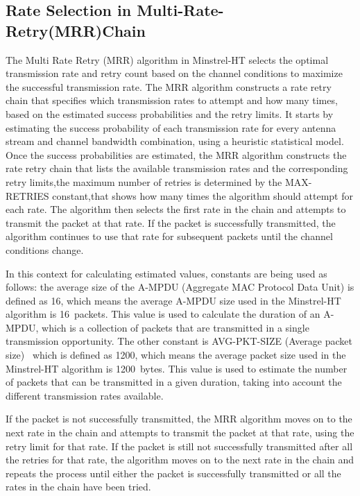 \subsection{Rate Selection in Multi-Rate-Retry(MRR)Chain}

The Multi Rate Retry (MRR) algorithm in Minstrel-HT selects the optimal transmission rate and retry count based on the channel conditions to maximize the successful transmission rate. The MRR algorithm constructs a rate retry chain that specifies which transmission rates to attempt and how many times, based on the estimated success probabilities and the retry limits. It starts by estimating the success probability of each transmission rate for every antenna stream and channel bandwidth combination, using a heuristic statistical model. Once the success probabilities are estimated, the MRR algorithm constructs the rate retry chain that lists the available transmission rates and the corresponding retry limits,the maximum number of retries is determined by the MAX-RETRIES constant,that shows how many times the algorithm should attempt for each rate. The algorithm then selects the first rate in the chain and attempts to transmit the packet at that rate. If the packet is successfully transmitted, the algorithm continues to use that rate for subsequent packets until the channel conditions change. 

In this context for calculating estimated values, constants are being used as follows: the average size of the A-MPDU (Aggregate MAC Protocol Data Unit) is defined as 16, which means the average A-MPDU size used in the Minstrel-HT algorithm is 16~packets. This value is used to calculate the duration of an A-MPDU, which is a collection of packets that are transmitted in a single transmission opportunity. The other constant is  AVG-PKT-SIZE (Average packet size)~\label{item:AVG_PKT_SIZE} which is defined as 1200, which means the average packet size used in the Minstrel-HT algorithm is 1200~bytes. This value is used to estimate the number of packets that can be transmitted in a given duration, taking into account the different transmission rates available.

If the packet is not successfully transmitted, the MRR algorithm moves on to the next rate in the chain and attempts to transmit the packet at that rate, using the retry limit for that rate. If the packet is still not successfully transmitted after all the retries for that rate, the algorithm moves on to the next rate in the chain and repeats the process until either the packet is successfully transmitted or all the rates in the chain have been tried.

